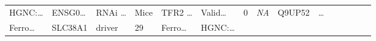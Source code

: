 \documentclass[
]{article}
\begin{document}
\begin{longtable}[]{@{}lllllllllllllll@{}}
\begin{minipage}[t]{0.05\columnwidth}
HGNC:\ldots{}\strut
\end{minipage} & \begin{minipage}[t]{0.05\columnwidth}\raggedright
ENSG0\ldots{}\strut
\end{minipage} & \begin{minipage}[t]{0.05\columnwidth}\raggedright
RNAi \ldots{}\strut
\end{minipage} & \begin{minipage}[t]{0.05\columnwidth}\raggedright
Mice\strut
\end{minipage} & \begin{minipage}[t]{0.05\columnwidth}\raggedright
TFR2 \ldots{}\strut
\end{minipage} & \begin{minipage}[t]{0.05\columnwidth}\raggedright
Valid\ldots{}\strut
\end{minipage} & \begin{minipage}[t]{0.05\columnwidth}\raggedright
0\strut
\end{minipage} & \begin{minipage}[t]{0.05\columnwidth}\raggedright
\emph{NA}\strut
\end{minipage} & \begin{minipage}[t]{0.05\columnwidth}\raggedright
Q9UP52\strut
\end{minipage} & \begin{minipage}[t]{0.02\columnwidth}\raggedright
\ldots{}\strut
\end{minipage}\tabularnewline
\begin{minipage}[t]{0.05\columnwidth}\raggedright
Ferro\ldots{}\strut
\end{minipage} & \begin{minipage}[t]{0.05\columnwidth}\raggedright
SLC38A1\strut
\end{minipage} & \begin{minipage}[t]{0.04\columnwidth}\raggedright
driver\strut
\end{minipage} & \begin{minipage}[t]{0.02\columnwidth}\raggedright
29\strut
\end{minipage} & \begin{minipage}[t]{0.05\columnwidth}\raggedright
Ferro\ldots{}\strut
\end{minipage} & \begin{minipage}[t]{0.05\columnwidth}\raggedright
HGNC:\ldots{}\strut
\end{minipage} & \begin{minipage}[t]{0.05\columnwidth}\raggedright

\end{minipage}
\end{longtable}
\end{document}
